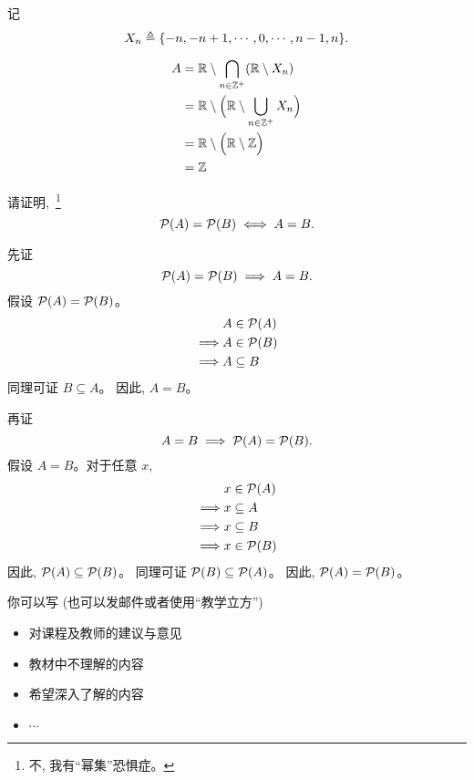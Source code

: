 \documentclass[a4paper, justified]{tufte-handout}
\begin{document}
\begin{solution}
  记
  \[
    X_n \triangleq \{-n, -n+1, \cdots, 0, \cdots, n-1, n\}.
  \]

  \setcounter{equation}{0}
  \begin{align}
    A &= \mathbb{R} \setminus \bigcap_{n \in \mathbb{Z}^{+}} (\mathbb{R} \setminus X_n) \\
    &= \mathbb{R} \setminus \Big(\mathbb{R} \setminus \bigcup_{n \in \mathbb{Z}^{+}} X_n \Big) \\
    &= \mathbb{R} \setminus \Big(\mathbb{R} \setminus \mathbb{Z} \Big) \\
    &= \mathbb{Z}
  \end{align}
\end{solution}

\begin{problem}
  请证明,~\footnote{不, 我有``幂集''恐惧症。}
  \[
    \mathcal{P}(A) = \mathcal{P}(B) \iff A = B.
  \]
\end{problem}

\begin{solution}
  先证
  \[
    \mathcal{P}(A) = \mathcal{P}(B) \implies A = B.
  \]
  假设 $\mathcal{P}(A) = \mathcal{P}(B)$。
  \begin{align*}
    &A \in \mathcal{P}(A) \\
    \implies &A \in \mathcal{P}(B) \\
    \implies &A \subseteq B
  \end{align*}
  同理可证 $B \subseteq A$。
  因此, $A = B$。

  \noindent 再证
  \[
    A = B \implies \mathcal{P}(A) = \mathcal{P}(B).
  \]
  假设 $A = B$。对于任意 $x$,
  \begin{align*}
    &x \in \mathcal{P}(A) \\
    \implies &x \subseteq A \\
    \implies &x \subseteq B \\
    \implies &x \in \mathcal{P}(B)
  \end{align*}
  因此, $\mathcal{P}(A) \subseteq \mathcal{P}(B)$。
  同理可证 $\mathcal{P}(B) \subseteq \mathcal{P}(A)$。
  因此, $\mathcal{P}(A) = \mathcal{P}(B)$。
\end{solution}


\begincorrection

\beginfb

你可以写 (也可以发邮件或者使用``教学立方'')
\begin{itemize}
  \item 对课程及教师的建议与意见
  \item 教材中不理解的内容
  \item 希望深入了解的内容
  \item $\cdots$
\end{itemize}
\end{document}

